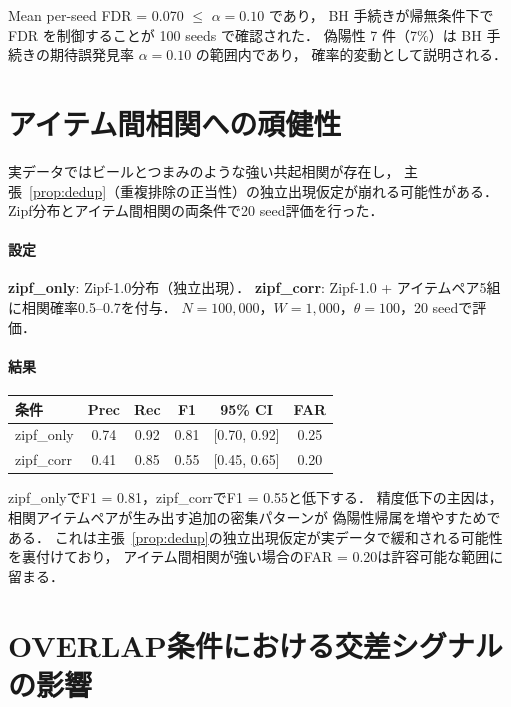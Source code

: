 Mean per-seed FDR = 0.070 $\leq$ $\alpha = 0.10$ であり，
BH 手続きが帰無条件下で FDR を制御することが 100 seeds で確認された．
偽陽性 7 件（7\%）は BH 手続きの期待誤発見率 $\alpha = 0.10$ の範囲内であり，
確率的変動として説明される．

\section{アイテム間相関への頑健性}\label{app:item_correlation}

実データではビールとつまみのような強い共起相関が存在し，
主張~\ref{prop:dedup}（重複排除の正当性）の独立出現仮定が崩れる可能性がある．
Zipf分布とアイテム間相関の両条件で20 seed評価を行った．

\paragraph{設定}
\textbf{zipf\_only}: Zipf-1.0分布（独立出現）．
\textbf{zipf\_corr}: Zipf-1.0 + アイテムペア5組に相関確率0.5--0.7を付与．
$N=100{,}000$，$W=1{,}000$，$\theta=100$，20 seedで評価．

\paragraph{結果}
\begin{center}
\begin{tabular}{lccccc}
\toprule
条件 & Prec & Rec & F1 & 95\% CI & FAR \\
\midrule
zipf\_only & 0.74 & 0.92 & 0.81 & [0.70, 0.92] & 0.25 \\
zipf\_corr & 0.41 & 0.85 & 0.55 & [0.45, 0.65] & 0.20 \\
\bottomrule
\end{tabular}
\end{center}

zipf\_onlyでF1 = 0.81，zipf\_corrでF1 = 0.55と低下する．
精度低下の主因は，相関アイテムペアが生み出す追加の密集パターンが
偽陽性帰属を増やすためである．
これは主張~\ref{prop:dedup}の独立出現仮定が実データで緩和される可能性を裏付けており，
アイテム間相関が強い場合のFAR = 0.20は許容可能な範囲に留まる．

\section{OVERLAP条件における交差シグナルの影響}\label{app:overlap_analysis}

